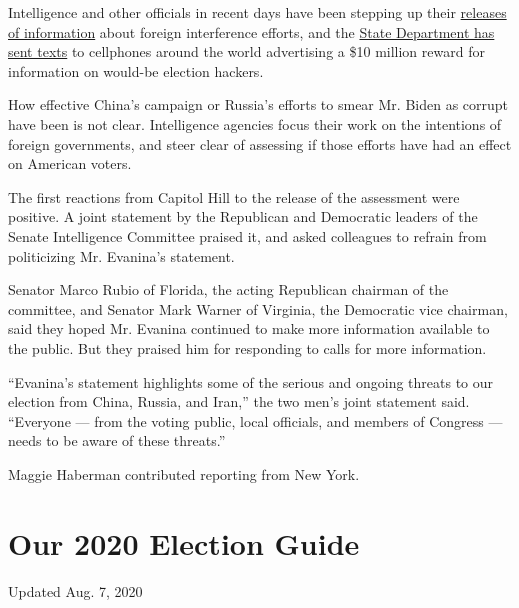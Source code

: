 Intelligence and other officials in recent days have been stepping up
their
\href{https://www.nytimes3xbfgragh.onion/2020/07/24/us/politics/election-interference-russia-china-iran.html}{releases
of information} about foreign interference efforts, and the
\href{https://www.nytimes3xbfgragh.onion/2020/08/06/us/politics/election-meddling-texts-russia-iran.html}{State
Department has sent texts} to cellphones around the world advertising a
\$10 million reward for information on would-be election hackers.

How effective China's campaign or Russia's efforts to smear Mr. Biden as
corrupt have been is not clear. Intelligence agencies focus their work
on the intentions of foreign governments, and steer clear of assessing
if those efforts have had an effect on American voters.

The first reactions from Capitol Hill to the release of the assessment
were positive. A joint statement by the Republican and Democratic
leaders of the Senate Intelligence Committee praised it, and asked
colleagues to refrain from politicizing Mr. Evanina's statement.

Senator Marco Rubio of Florida, the acting Republican chairman of the
committee, and Senator Mark Warner of Virginia, the Democratic vice
chairman, said they hoped Mr. Evanina continued to make more information
available to the public. But they praised him for responding to calls
for more information.

``Evanina's statement highlights some of the serious and ongoing threats
to our election from China, Russia, and Iran,'' the two men's joint
statement said. ``Everyone --- from the voting public, local officials,
and members of Congress --- needs to be aware of these threats.''

Maggie Haberman contributed reporting from New York.

\hypertarget{our-2020-election-guide}{%
\section{Our 2020 Election Guide}\label{our-2020-election-guide}}

Updated Aug. 7, 2020

